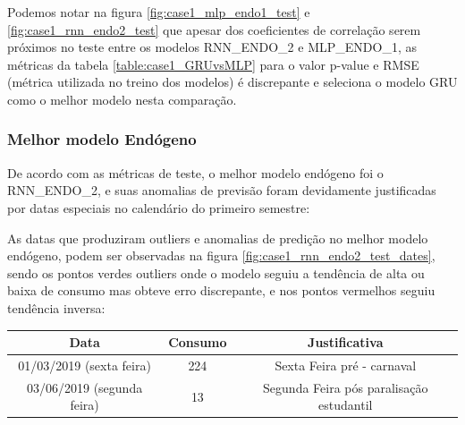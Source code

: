 \documentclass[	12pt, Times, openright, twoside, a4paper, english, brazil]{abntex2}
\begin{document}
            Podemos notar na figura \ref{fig:case1_mlp_endo1_test} e \ref{fig:case1_rnn_endo2_test} que apesar dos coeficientes de correlação serem próximos no teste entre os modelos RNN\_ENDO\_2 e MLP\_ENDO\_1, as métricas da tabela \ref{table:case1_GRUvsMLP} para o valor p-value e RMSE (métrica utilizada no treino dos modelos) é discrepante e seleciona o modelo GRU como o melhor modelo nesta comparação.\newline

    	    \subsubsection{Melhor modelo Endógeno}
            De acordo com as métricas de teste, o melhor modelo endógeno foi o RNN\_ENDO\_2, e suas anomalias de previsão foram devidamente justificadas por datas especiais no calendário do primeiro semestre:
            
            \begin{figure}[H]
            \end{figure}
            
            As datas que produziram outliers e anomalias de predição no melhor modelo endógeno, podem ser observadas na figura \ref{fig:case1_rnn_endo2_test_dates}, sendo os pontos verdes outliers onde o modelo seguiu a tendência de alta ou baixa de consumo mas obteve erro discrepante, e nos pontos vermelhos seguiu tendência inversa:

            \begin{table}[!ht]
                \centering
                 \begin{tabular}{|c|c|c|}
                 \rowcolor{gray!50}
                 \hline 
             Data & Consumo & Justificativa\\ \hline    
            01/03/2019 (sexta feira)    & 224 & Sexta Feira pré - carnaval\\
             03/06/2019 (segunda feira)  &  13 & Segunda Feira pós paralisação estudantil\\ \hline \end{tabular} \end{table}
\end{document}
